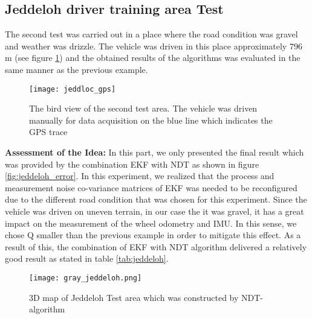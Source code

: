 \subsection{Jeddeloh driver training area Test} The second test was carried out in a place where the road condition was gravel and weather was drizzle. The vehicle was driven in this place approximately 796 m (see figure \ref{fig:jeddeloh_gps}) and the obtained results of the algorithms was evaluated in the same manner as the previous example.
\\
\begin{figure}[H]
    \centering
    \texttt{[image: jeddloc\_gps]}
    \caption{The bird view of the second test area. The vehicle was driven manually for data acquisition on the blue line which indicates the GPS trace}
    \label{fig:jeddeloh_gps}
\end{figure}
\noindent\textbf{Assessment of the Idea:} In this part, we only presented the final result which was provided by the combination EKF with NDT  as shown in figure \ref{fig:jeddeloh_error}. 
In this experiment, we realized that the process and measurement noise co-variance matrices of EKF was needed to be reconfigured due to the different road condition that was chosen for this experiment. Since the vehicle was driven on uneven terrain, in our case the it was gravel, it has a great impact on the measurement of the wheel odometry and IMU. In this sense, we chose Q smaller than the previous example in order to mitigate this effect. As a result of this, the combination of EKF with NDT algorithm delivered a relatively good result as stated in table \ref{tab:jeddeloh}. 
\\
\begin{figure}[H]
    \centering
    \texttt{[image: gray\_jeddeloh.png]}
    \caption{3D map of Jeddeloh Test area which was constructed by NDT-algorithm}
    \label{fig:3D_jeddeloh}
\end{figure}

